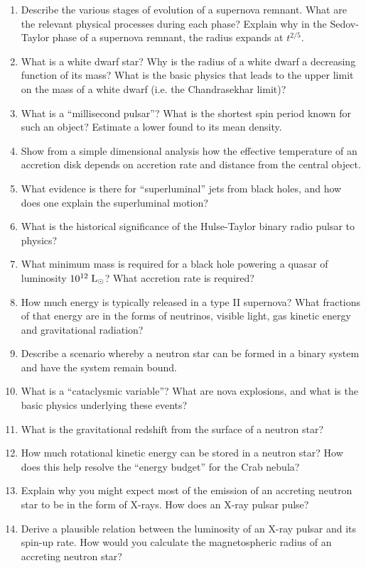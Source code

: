\documentclass[11pt, oneside]{book}
\begin{document}
\begin{enumerate}[start=38, itemsep=0.4cm]
    \item Describe the various stages of evolution of a supernova remnant. What are the relevant physical processes during each phase? Explain why in the Sedov-Taylor phase of a supernova remnant, the radius expands at $t^{2/5}$.
    \item What is a white dwarf star? Why is the radius of a white dwarf a decreasing function of its mass? What is the basic physics that leads to the upper limit on the mass of a white dwarf (i.e. the Chandrasekhar limit)?
    \item What is a ``millisecond pulsar''? What is the shortest spin period known for such an object? Estimate a lower found to its mean density.
    \item Show from a simple dimensional analysis how the effective temperature of an accretion disk depends on accretion rate and distance from the central object.
    \item What evidence is there for ``superluminal'' jets from black holes, and how does one explain the superluminal motion?
    \item What is the historical significance of the Hulse-Taylor binary radio pulsar to physics?
    \item What minimum mass is required for a black hole powering a quasar of luminosity $10^{12} \; {\rm L_{\odot}}$? What accretion rate is required?
    \item How much energy is typically released in a type II supernova? What fractions of that energy are in the forms of neutrinos, visible light, gas kinetic energy and gravitational radiation?
    \item Describe a scenario whereby a neutron star can be formed in a binary system and have the system remain bound.
    \item What is a ``cataclysmic variable''? What are nova explosions, and what is the basic physics underlying these events?
    \item What is the gravitational redshift from the surface of a neutron star?
    \item How much rotational kinetic energy can be stored in a neutron star? How does this help resolve the ``energy budget'' for the Crab nebula?
    \item Explain why you might expect most of the emission of an accreting neutron star to be in the form of X-rays. How does an X-ray pulsar pulse?
    \item Derive a plausible relation between the luminosity of an X-ray pulsar and its spin-up rate. How would you calculate the magnetospheric radius of an accreting neutron star?

\end{enumerate}
\end{document}
